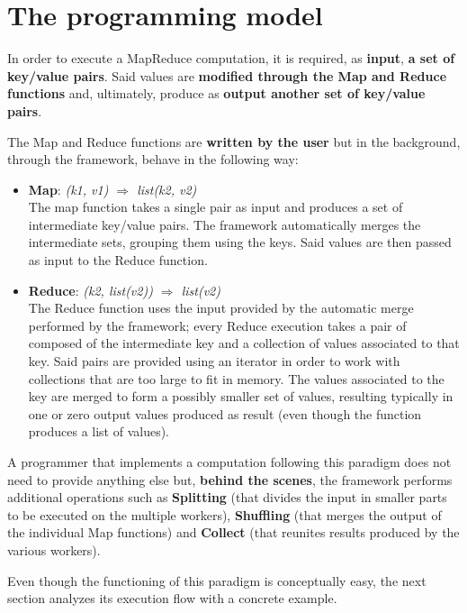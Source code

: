 \section{The programming model}
In order to execute a MapReduce computation, it is required, as \textbf{input}, \textbf{a set of key/value pairs}. Said values are \textbf{modified through the Map and Reduce functions} and, ultimately, produce as \textbf{output another set of key/value pairs}. 

The Map and Reduce functions are \textbf{written by the user} but in the background, through the framework, behave in the following way:
\begin{itemize}
    \item \textbf{Map}: \textit{(k1, v1) $\Longrightarrow$ list(k2, v2)}\\
    The map function takes a single pair as input and produces a set of intermediate key/value pairs. The framework automatically merges the intermediate sets, grouping them using the keys. Said values are then passed as input to the Reduce function.
    \item \textbf{Reduce}: \textit{(k2, list(v2)) $\Longrightarrow$ list(v2)}\\
    The Reduce function uses the input provided by the automatic merge performed by the framework; every Reduce execution takes a pair of composed of the intermediate key and a collection of values associated to that key. Said pairs are provided using an iterator in order to work with collections that are too large to fit in memory. The values associated to the key are merged to form a possibly smaller set of values, resulting typically in one or zero output values produced as result (even though the function produces a list of values).
\end{itemize}
A programmer that implements a computation following this paradigm does not need to provide anything else but, \textbf{behind the scenes}, the framework performs additional operations such as \textbf{Splitting} (that divides the input in smaller parts to be executed on the multiple workers), \textbf{Shuffling} (that merges the output of the individual Map functions) and \textbf{Collect} (that reunites results produced by the various workers).

Even though the functioning of this paradigm is conceptually easy, the next section analyzes its execution flow with a concrete example.